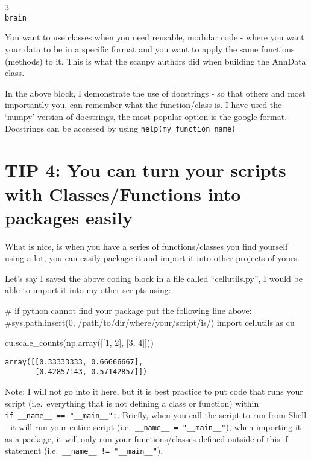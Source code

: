 \documentclass[
  letterpaper,
  DIV=11,
  numbers=noendperiod]{scrartcl}
\newenvironment{Shaded}{\begin{snugshade}}{\end{snugshade}}
\newcommand{\CommentTok}[1]{\textcolor[rgb]{0.37,0.37,0.37}{#1}}
\newcommand{\DecValTok}[1]{\textcolor[rgb]{0.68,0.00,0.00}{#1}}
\newcommand{\ImportTok}[1]{\textcolor[rgb]{0.00,0.46,0.62}{#1}}
\newcommand{\NormalTok}[1]{\textcolor[rgb]{0.00,0.23,0.31}{#1}}
\begin{document}
\begin{verbatim}
3
brain
\end{verbatim}

You want to use classes when you need reusable, modular code - where you
want your data to be in a specific format and you want to apply the same
functions (methods) to it. This is what the scanpy authors did when
building the AnnData class.

In the above block, I demonstrate the use of docstrings - so that others
and most importantly you, can remember what the function/class is. I
have used the `numpy' version of docstrings, the most popular option is
the google format. Docstrings can be accessed by using
\texttt{help(my\_function\_name)}

\section{TIP 4: You can turn your scripts with Classes/Functions into
packages
easily}\label{tip-4-you-can-turn-your-scripts-with-classesfunctions-into-packages-easily}

What is nice, is when you have a series of functions/classes you find
yourself using a lot, you can easily package it and import it into other
projects of yours.

Let's say I saved the above coding block in a file called
``cellutils.py'', I would be able to import it into my other scripts
using:

\begin{Shaded}
\begin{Highlighting}[]
\CommentTok{\# if python cannot find your package put the following line above:}
\CommentTok{\#sys.path.insert(0, \textquotesingle{}/path/to/dir/where/your/script/is/\textquotesingle{})}
\ImportTok{import}\NormalTok{ cellutils }\ImportTok{as}\NormalTok{ cu}

\NormalTok{cu.scale\_counts(np.array([[}\DecValTok{1}\NormalTok{, }\DecValTok{2}\NormalTok{], [}\DecValTok{3}\NormalTok{, }\DecValTok{4}\NormalTok{]]))}
\end{Highlighting}
\end{Shaded}

\begin{verbatim}
array([[0.33333333, 0.66666667],
       [0.42857143, 0.57142857]])
\end{verbatim}

Note: I will not go into it here, but it is best practice to put code
that runs your script (i.e.~everything that is not defining a class or
function) within \texttt{if\ \_\_name\_\_\ ==\ "\_\_main\_\_":}.
Briefly, when you call the script to run from Shell - it will run your
entire script (i.e.~\texttt{\_\_name\_\_\ =\ "\_\_main\_\_"}), when
importing it as a package, it will only run your functions/classes
defined outside of this if statement
(i.e.~\texttt{\_\_name\_\_\ !=\ "\_\_main\_\_"}).
\end{document}
